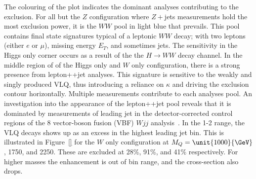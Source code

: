 The colouring of the plot indicates the dominant analyses contributing to the exclusion. For all but the $Z$ configuration where $Z+$jets measurements hold the most exclusion power, it is the \ATLAS $WW$ pool in light blue that prevails. This pool contains final state signatures typical of a leptonic $WW$ decay; with two leptons (either $e$ or $\mu$), missing energy $E_T$, and sometimes jets. The sensitivity in the Higgs only corner occurs as a result of the the $H\rightarrow WW$ decay channel. In the middle region of of the Higgs only and $W$ only configuration, there is a strong presence from \ATLAS lepton+\MET{}+jet analyses. This signature is sensitive to the weakly and singly produced VLQ, thus introducing a reliance on $\kappa$ and driving the exclusion contour horizontally. Multiple measurements contribute to each analyses pool. An investigation into the appearance of the lepton+\MET{}+jet pool reveals that it is dominated by measurements of leading jet \pT in the detector-corrected control regions of the \unit{8}{\TeV} \ATLAS vector-boson fusion (VBF) $Wjj$ analysis~\cite{Aaboud:2017fye}. In the \unit{1}{\TeV}-\unit{2}{\TeV} range, the VLQ decays shows up as an excess in the highest leading jet \pT bin. This is illustrated in Figure~\ref{} for the $W$ only configuration at $M_Q=\unit{1000}{\GeV}$, \unit{1750}{\GeV}, and \unit{2250}{\GeV}. These are excluded at 28\%, 91\%, and 41\% respectively. For higher masses the enhancement is out of bin range, and the cross-section also drops. 

